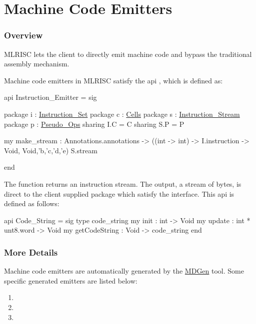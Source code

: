 \section{Machine Code Emitters}

\subsubsection{Overview}
MLRISC lets the client to directly emit machine code and bypass the traditional
assembly mechanism. 

Machine code emitters in MLRISC satisfy the api 
,
which is defined as:
\begin{SML}
api Instruction_Emitter =
sig

   package i : \href{instructions.html}{Instruction_Set}
   package c : \href{cells.html}{Cells}
   package s : \href{streams.html}{Instruction_Stream}
   package p : \href{pseudo-ops.html}{Pseudo_Ops}
      sharing I.C = C  
      sharing S.P = P

   my make_stream : Annotations.annotations ->
                     ((int -> int) -> I.instruction -> Void,
                      Void,'b,'c,'d,'e) S.stream

end
\end{SML}

The function  returns an instruction stream.
The output, a stream of bytes, is direct to the client supplied
package which satisfy the 
 interface.
This api is defined as follows:
\begin{SML}
api Code_String = sig
  type code_string
  my init          : int -> Void
  my update        : int * unt8.word -> Void
  my getCodeString : Void -> code_string
end
\end{SML}

\subsubsection{More Details}

Machine code emitters are automatically generated by the 
\href{mlrisc-md.html}{MDGen} tool.  Some specific generated
emitters are listed below:
\begin{enumerate}
 \item {}
 \item {}
 \item {}
\end{enumerate}
